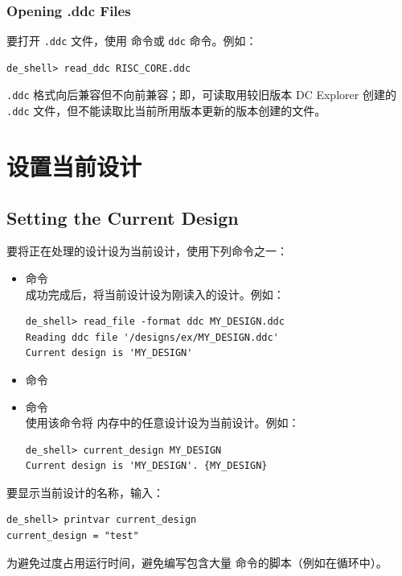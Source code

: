 \subsubsection*{Opening .ddc Files}

要打开 \texttt{.ddc} 文件，使用  命令或   \texttt{ddc} 命令。例如：
\begin{lstlisting}
de_shell> read_ddc RISC_CORE.ddc
\end{lstlisting}

\texttt{.ddc} 格式向后兼容但不向前兼容；即，可读取用较旧版本 DC Explorer 创建的 \texttt{.ddc} 文件，但不能读取比当前所用版本更新的版本创建的文件。

\section{设置当前设计}
\subsection*{Setting the Current Design}

要将正在处理的设计设为当前设计，使用下列命令之一：
\begin{itemize}
  \item {} 命令\\
         成功完成后，将当前设计设为刚读入的设计。例如：
\begin{lstlisting}
de_shell> read_file -format ddc MY_DESIGN.ddc
Reading ddc file '/designs/ex/MY_DESIGN.ddc'
Current design is 'MY_DESIGN'
\end{lstlisting}
  \item {} 命令
  \item {} 命令\\
        使用该命令将  内存中的任意设计设为当前设计。例如：
\begin{lstlisting}
de_shell> current_design MY_DESIGN
Current design is 'MY_DESIGN'. {MY_DESIGN}
\end{lstlisting}
\end{itemize}

要显示当前设计的名称，输入：
\begin{lstlisting}
de_shell> printvar current_design
current_design = "test"
\end{lstlisting}

为避免过度占用运行时间，避免编写包含大量  命令的脚本（例如在循环中）。

